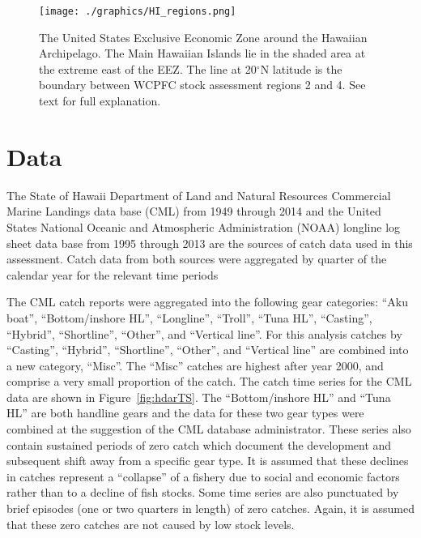 \documentclass[12pt,letterpaper]{article}
\renewcommand\deg[1]{$^\circ$#1}
\begin{document}
\begin{figure}
\begin{center}
\texttt{[image: ./graphics/HI\_regions.png]}
\caption{\label{fig:mhimap}
The United States Exclusive Economic Zone around the Hawaiian
Archipelago. The Main Hawaiian Islands lie in the shaded area at the
extreme east of the EEZ. The line at 20\deg{N} latitude is the
boundary between WCPFC stock assessment regions 2 and 4. See text for
full explanation.
}
\end{center}
\end{figure}


\section*{Data}
The State of Hawaii Department of Land and Natural Resources
Commercial Marine Landings data base (CML) from 1949 through 2014 
and the United States National Oceanic and
Atmospheric Administration (NOAA) longline log sheet data base from
1995 through 2013
are the sources of catch data used in this assessment. Catch data from
both sources were aggregated by quarter of the calendar year for the
relevant time periods 

The CML catch reports were aggregated into the following gear
categories:
``Aku boat'', ``Bottom/inshore HL'', ``Longline'',  ``Troll'', ``Tuna
HL'', ``Casting'', ``Hybrid'',  ``Shortline'', ``Other'', and
``Vertical line''.
For this analysis catches by ``Casting'', ``Hybrid'',
``Shortline'', ``Other'', and ``Vertical line'' are combined into a new
category, ``Misc''. The ``Misc''
catches are highest after year 2000,
and comprise a very small proportion of the catch.
The catch time series for the CML data are shown in Figure~\ref{fig:hdarTS}.
The ``Bottom/inshore HL'' and ``Tuna HL'' are both handline gears and
the data for these two gear types were combined at the suggestion of
the CML database administrator.
These series also contain sustained periods of zero catch which
document the development and subsequent shift away from a specific
gear type. It is assumed that these declines in catches represent a
``collapse'' of a fishery due to social and economic factors rather than
to a decline of fish stocks.
Some time series are also punctuated by brief episodes (one or two quarters in
length) of zero catches. Again, it is assumed that these zero catches
are not caused by low stock levels.
\end{document}
